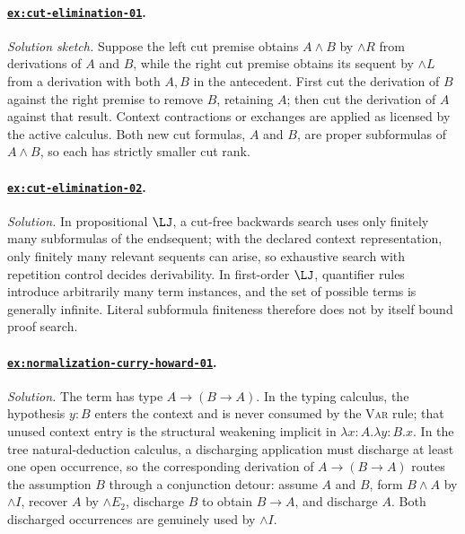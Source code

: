\paragraph{\hyperref[ex:cut-elimination-01]{\texttt{ex:cut-elimination-01}}.}
\textit{Solution sketch.}  Suppose the left cut premise obtains
\(A\land B\) by \(\land R\) from derivations of \(A\) and \(B\), while the
right cut premise obtains its sequent by \(\land L\) from a derivation with
both \(A,B\) in the antecedent.  First cut the derivation of \(B\) against the
right premise to remove \(B\), retaining \(A\); then cut the derivation of
\(A\) against that result.  Context contractions or exchanges are applied as
licensed by the active calculus.  Both new cut formulas, \(A\) and \(B\), are
proper subformulas of \(A\land B\), so each has strictly smaller cut rank.

\paragraph{\hyperref[ex:cut-elimination-02]{\texttt{ex:cut-elimination-02}}.}
\textit{Solution.}  In propositional \(\LJ\), a cut-free backwards search uses
only finitely many subformulas of the endsequent; with the declared context
representation, only finitely many relevant sequents can arise, so exhaustive
search with repetition control decides derivability.  In first-order
\(\LJ\), quantifier rules introduce arbitrarily many term instances, and the
set of possible terms is generally infinite.  Literal subformula finiteness
therefore does not by itself bound proof search.

\paragraph{\hyperref[ex:normalization-curry-howard-01]{\texttt{ex:normalization-curry-howard-01}}.}
\textit{Solution.}  The term has type \(A\to(B\to A)\).  In the typing
calculus, the hypothesis \(y:B\) enters the context and is never consumed
by the \textsc{Var} rule; that unused context entry is the structural
weakening implicit in \(\lambda x{:}A.\lambda y{:}B.x\).  In the tree
natural-deduction calculus, a discharging application must discharge at
least one open occurrence, so the corresponding derivation of
\(A\to(B\to A)\) routes the assumption \(B\) through a conjunction
detour: assume \(A\) and \(B\), form \(B\land A\) by \(\land I\), recover
\(A\) by \(\land E_2\), discharge \(B\) to obtain \(B\to A\), and
discharge \(A\).  Both discharged occurrences are genuinely used by
\(\land I\).

